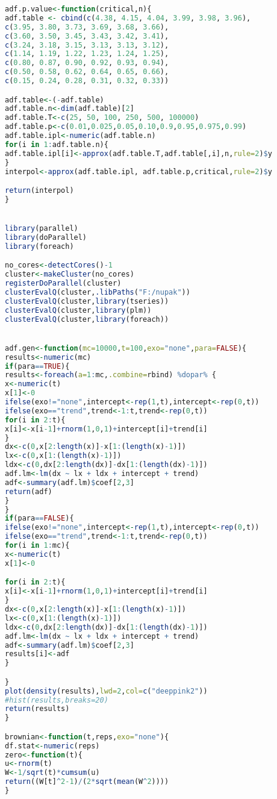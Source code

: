 \begin{lstlisting}[language=R]
adf.p.value<-function(critical,n){
adf.table <- cbind(c(4.38, 4.15, 4.04, 3.99, 3.98, 3.96), 
c(3.95, 3.80, 3.73, 3.69, 3.68, 3.66), 
c(3.60, 3.50, 3.45, 3.43, 3.42, 3.41), 
c(3.24, 3.18, 3.15, 3.13, 3.13, 3.12), 
c(1.14, 1.19, 1.22, 1.23, 1.24, 1.25), 
c(0.80, 0.87, 0.90, 0.92, 0.93, 0.94), 
c(0.50, 0.58, 0.62, 0.64, 0.65, 0.66), 
c(0.15, 0.24, 0.28, 0.31, 0.32, 0.33)) 

adf.table<-(-adf.table)
adf.table.n<-dim(adf.table)[2]
adf.table.T<-c(25, 50, 100, 250, 500, 100000)
adf.table.p<-c(0.01,0.025,0.05,0.10,0.9,0.95,0.975,0.99)
adf.table.ipl<-numeric(adf.table.n)
for(i in 1:adf.table.n){
adf.table.ipl[i]<-approx(adf.table.T,adf.table[,i],n,rule=2)$y
}
interpol<-approx(adf.table.ipl, adf.table.p,critical,rule=2)$y

return(interpol)
}


library(parallel)
library(doParallel)
library(foreach)

no_cores<-detectCores()-1
cluster<-makeCluster(no_cores)
registerDoParallel(cluster)
clusterEvalQ(cluster,.libPaths("F:/nupak"))
clusterEvalQ(cluster,library(tseries))
clusterEvalQ(cluster,library(plm))
clusterEvalQ(cluster,library(foreach))


adf.gen<-function(mc=10000,t=100,exo="none",para=FALSE){
results<-numeric(mc)
if(para==TRUE){
results<-foreach(a=1:mc,.combine=rbind) %dopar% {
x<-numeric(t)
x[1]<-0
ifelse(exo!="none",intercept<-rep(1,t),intercept<-rep(0,t))
ifelse(exo=="trend",trend<-1:t,trend<-rep(0,t))
for(i in 2:t){
x[i]<-x[i-1]+rnorm(1,0,1)+intercept[i]+trend[i]
}
dx<-c(0,x[2:length(x)]-x[1:(length(x)-1)])
lx<-c(0,x[1:(length(x)-1)])
ldx<-c(0,dx[2:length(dx)]-dx[1:(length(dx)-1)])
adf.lm<-lm(dx ~ lx + ldx + intercept + trend)
adf<-summary(adf.lm)$coef[2,3]
return(adf)
}
}
if(para==FALSE){
ifelse(exo!="none",intercept<-rep(1,t),intercept<-rep(0,t))
ifelse(exo=="trend",trend<-1:t,trend<-rep(0,t))
for(i in 1:mc){
x<-numeric(t)
x[1]<-0

for(i in 2:t){
x[i]<-x[i-1]+rnorm(1,0,1)+intercept[i]+trend[i]
}
dx<-c(0,x[2:length(x)]-x[1:(length(x)-1)])
lx<-c(0,x[1:(length(x)-1)])
ldx<-c(0,dx[2:length(dx)]-dx[1:(length(dx)-1)])
adf.lm<-lm(dx ~ lx + ldx + intercept + trend)
adf<-summary(adf.lm)$coef[2,3]
results[i]<-adf
}

}
plot(density(results),lwd=2,col=c("deeppink2"))
#hist(results,breaks=20)
return(results)
}

brownian<-function(t,reps,exo="none"){
df.stat<-numeric(reps)
zero<-function(t){
u<-rnorm(t)
W<-1/sqrt(t)*cumsum(u)
return((W[t]^2-1)/(2*sqrt(mean(W^2))))
}


\end{lstlisting}
